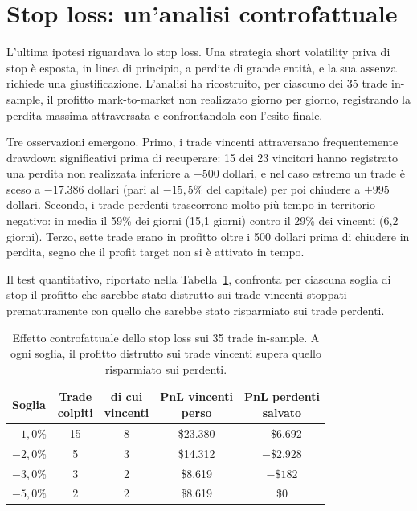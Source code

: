 \section{Stop loss: un'analisi controfattuale}
\label{sec:percorso-stoploss}

L'ultima ipotesi riguardava lo stop loss. Una strategia short volatility
priva di stop è esposta, in linea di principio, a perdite di grande entità,
e la sua assenza richiede una giustificazione. L'analisi ha ricostruito, per
ciascuno dei 35 trade in-sample, il profitto mark-to-market non realizzato
giorno per giorno, registrando la perdita massima attraversata e
confrontandola con l'esito finale.

Tre osservazioni emergono. Primo, i trade vincenti attraversano
frequentemente drawdown significativi prima di recuperare: 15 dei 23
vincitori hanno registrato una perdita non realizzata inferiore a $-500$
dollari, e nel caso estremo un trade è sceso a $-17.386$ dollari (pari al
$-15{,}5\%$ del capitale) per poi chiudere a $+995$ dollari. Secondo, i
trade perdenti trascorrono molto più tempo in territorio negativo: in media
il 59\% dei giorni (15,1 giorni) contro il 29\% dei vincenti (6,2 giorni).
Terzo, sette trade erano in profitto oltre i 500 dollari prima di chiudere
in perdita, segno che il profit target non si è attivato in tempo.

Il test quantitativo, riportato nella Tabella~\ref{tab:stop-loss}, confronta
per ciascuna soglia di stop il profitto che sarebbe stato distrutto sui
trade vincenti stoppati prematuramente con quello che sarebbe stato
risparmiato sui trade perdenti.

\begin{table}[H]
\centering
\caption{Effetto controfattuale dello stop loss sui 35 trade in-sample. A
ogni soglia, il profitto distrutto sui trade vincenti supera quello
risparmiato sui perdenti.}
\label{tab:stop-loss}
\setlength{\tabcolsep}{6pt}
\begin{tabular}{lcccc}
\toprule
\textbf{Soglia} & \makecell{\textbf{Trade}\\\textbf{colpiti}} & \makecell{\textbf{di cui}\\\textbf{vincenti}} & \makecell{\textbf{PnL vincenti}\\\textbf{perso}} & \makecell{\textbf{PnL perdenti}\\\textbf{salvato}} \\
\midrule
$-1{,}0\%$ & 15 & 8 & \$23.380 & $-\$6.692$ \\
$-2{,}0\%$ & 5  & 3 & \$14.312 & $-\$2.928$ \\
$-3{,}0\%$ & 3  & 2 & \$8.619  & $-\$182$ \\
$-5{,}0\%$ & 2  & 2 & \$8.619  & \$0 \\
\bottomrule
\end{tabular}
\end{table}

